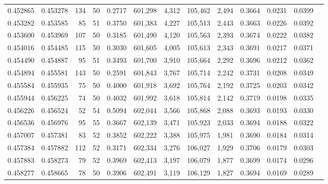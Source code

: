 \begin{tabular}{rrrrrrrrrrrrr}
0.452865 & 0.453278 &   134 &  50 &                                     0.2717 & 601,298 &   4,312 & 105,462 &   2,494 & 0.3664 & 0.0231 & 0.0399 \\
0.453282 & 0.453585 &    85 &  51 &                                     0.3750 & 601,383 &   4,227 & 105,513 &   2,443 & 0.3663 & 0.0226 & 0.0392 \\
0.453600 & 0.453969 &   107 &  50 &                                     0.3185 & 601,490 &   4,120 & 105,563 &   2,393 & 0.3674 & 0.0222 & 0.0382 \\
0.454016 & 0.454485 &   115 &  50 &                                     0.3030 & 601,605 &   4,005 & 105,613 &   2,343 & 0.3691 & 0.0217 & 0.0371 \\
0.454490 & 0.454887 &    95 &  51 &                                     0.3493 & 601,700 &   3,910 & 105,664 &   2,292 & 0.3696 & 0.0212 & 0.0362 \\
0.454894 & 0.455581 &   143 &  50 &                                     0.2591 & 601,843 &   3,767 & 105,714 &   2,242 & 0.3731 & 0.0208 & 0.0349 \\
0.455584 & 0.455935 &    75 &  50 &                                     0.4000 & 601,918 &   3,692 & 105,764 &   2,192 & 0.3725 & 0.0203 & 0.0342 \\
0.455944 & 0.456225 &    74 &  50 &                                     0.4032 & 601,992 &   3,618 & 105,814 &   2,142 & 0.3719 & 0.0198 & 0.0335 \\
0.456226 & 0.456524 &    52 &  54 &                                     0.5094 & 602,044 &   3,566 & 105,868 &   2,088 & 0.3693 & 0.0193 & 0.0330 \\
0.456536 & 0.456976 &    95 &  55 &                                     0.3667 & 602,139 &   3,471 & 105,923 &   2,033 & 0.3694 & 0.0188 & 0.0322 \\
0.457007 & 0.457381 &    83 &  52 &                                     0.3852 & 602,222 &   3,388 & 105,975 &   1,981 & 0.3690 & 0.0184 & 0.0314 \\
0.457384 & 0.457882 &   112 &  52 &                                     0.3171 & 602,334 &   3,276 & 106,027 &   1,929 & 0.3706 & 0.0179 & 0.0303 \\
0.457883 & 0.458273 &    79 &  52 &                                     0.3969 & 602,413 &   3,197 & 106,079 &   1,877 & 0.3699 & 0.0174 & 0.0296 \\
0.458277 & 0.458665 &    78 &  50 &                                     0.3906 & 602,491 &   3,119 & 106,129 &   1,827 & 0.3694 & 0.0169 & 0.0289 \\

\end{tabular}
